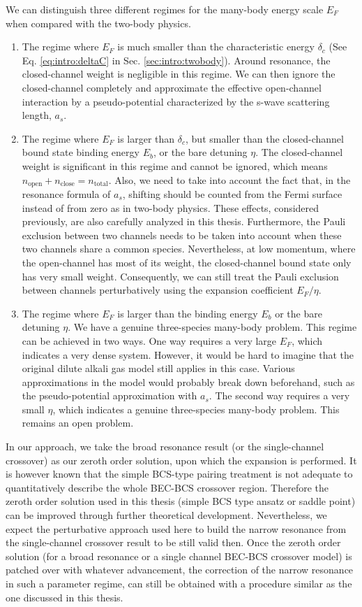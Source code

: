 \documentclass[reprint,pra]{revtex4-1}
\begin{document}
We can distinguish three different regimes for the many-body energy scale $E_F$ when compared with the two-body physics.  
\begin{enumerate}
\item The regime where $E_F$ is much smaller than the characteristic energy $\delta_c$ (See Eq. \ref{eq:intro:deltaC} in Sec. \ref{sec:intro:twobody}). Around resonance, the closed-channel weight is negligible in this regime. We can then ignore the closed-channel completely and approximate the effective open-channel interaction by a  pseudo-potential characterized by the s-wave scattering length, $a_s$. 
\item The regime where  $E_F$ is larger than $\delta_c$, but smaller than the closed-channel bound state binding energy $E_b$, or the bare detuning $\eta$.  The closed-channel weight is significant in this regime and cannot be ignored, which means $n_{\text{open}}+n_{\text{close}}=n_{\text{total}}$. Also, we need to take into account the fact that, in the resonance formula of $a_s$, shifting should be counted from the Fermi surface instead of from zero as in two-body physics.    These effects, considered previously\cite{GurarieNarrow}, are  also carefully analyzed in this thesis.  Furthermore, the Pauli exclusion between two channels needs to be taken into account when these two channels share a common species.  Nevertheless, at  low momentum, where the open-channel has most of its weight, the closed-channel bound state only has very small weight.  Consequently, we can still treat the Pauli exclusion between channels perturbatively using the expansion coefficient  $E_F/\eta$. 
\item The regime where  $E_F$ is larger than the binding energy $E_b$ or the bare detuning $\eta$. We have a genuine three-species many-body problem. This regime can be achieved in two ways.  One way requires a very large $E_F$, which indicates a very dense system.  However, it would be hard to imagine that  the original dilute alkali gas model still applies in this case. Various approximations in the model would probably break down beforehand, such as the pseudo-potential approximation with $a_s$. The second way requires a very small $\eta$, which indicates a genuine three-species many-body problem.  This remains an open problem.   
\end{enumerate}


     In our approach, we take the broad resonance result (or the single-channel crossover) as our zeroth order solution, upon which the expansion is performed.  It is however known that the simple BCS-type pairing treatment is not adequate  to quantitatively describe the whole BEC-BCS crossover region.  Therefore the zeroth order solution used in this thesis (simple BCS type ansatz or saddle point) can be improved through further theoretical development.  Nevertheless, we expect the perturbative approach used here to build the narrow resonance from the single-channel crossover result to be still valid then.  Once the zeroth order solution (for a broad resonance or a single channel BEC-BCS crossover model) is patched over with whatever advancement, the correction of the narrow resonance in such a parameter regime, can still be obtained with a procedure similar as the one discussed in this thesis.  
\end{document}
